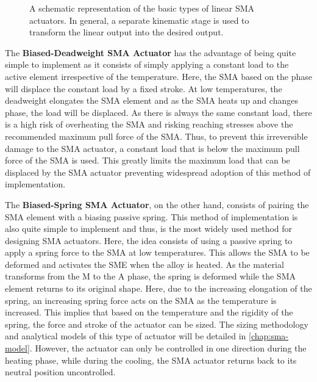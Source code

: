 \begin{figure}[hbt!]
    \centering
    
    \caption[A schematic representation of the basic types of linear SMA actuators]{A schematic representation of the basic types of linear SMA actuators. In general, a separate kinematic stage is used to transform the linear output into the desired output.}
    \label{fig:sma-actuators-diagram}
\end{figure}
The \textbf{Biased-Deadweight SMA Actuator} has the advantage of being quite simple to implement as it consists of simply applying a constant load to the active element irrespective of the temperature. Here, the SMA based on the phase will displace the constant load by a fixed stroke. At low temperatures, the deadweight elongates the SMA element and as the SMA heats up and changes phase, the load will be displaced. As there is always the same constant load, there is a high risk of overheating the SMA and risking reaching stresses above the recommended maximum pull force of the SMA. Thus, to prevent this irreversible damage to the SMA actuator, a constant load that is below the maximum pull force of the SMA is used. This greatly limits the maximum load that can be displaced by the SMA actuator preventing widespread adoption of this method of implementation.

The \textbf{Biased-Spring SMA Actuator}, on the other hand, consists of pairing the SMA element with a biasing passive spring. This method of implementation is also quite simple to implement and thus, is the most widely used method for designing SMA actuators. Here, the idea consists of using a passive spring to apply a spring force to the SMA at low temperatures. This allows the SMA to be deformed and activates the SME when the alloy is heated. As the material transforms from the M to the A phase, the spring is deformed while the SMA element returns to its original shape. Here, due to the increasing elongation of the spring, an increasing spring force acts on the SMA as the temperature is increased. This implies that based on the temperature and the rigidity of the spring, the force and stroke of the actuator can be sized. The sizing methodology and analytical models of this type of actuator will be detailed in \cref{chap:sma-model}. However, the actuator can only be controlled in one direction during the heating phase, while during the cooling, the SMA actuator returns back to its neutral position uncontrolled.


